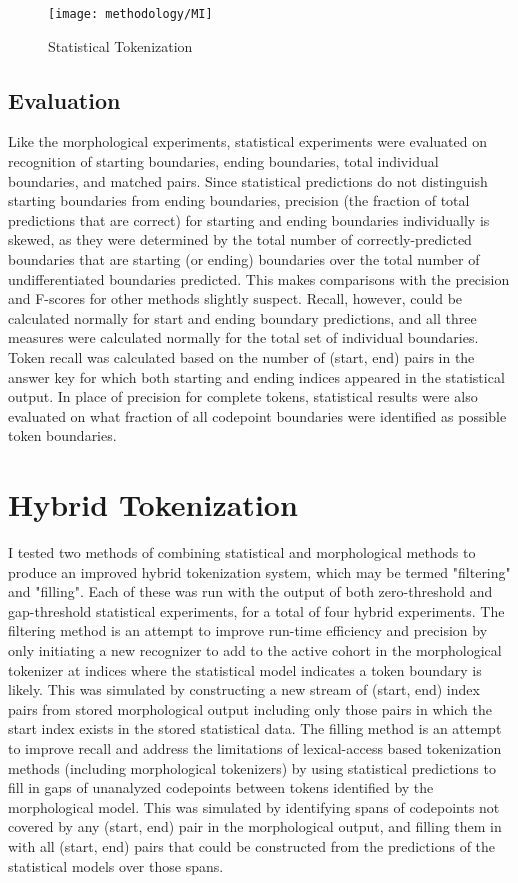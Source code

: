 \begin{figure}[ht!]
	\texttt{[image: methodology/MI]}
	\caption{Statistical Tokenization}
	\label{statdiagram}
\end{figure}

\subsection{Evaluation}
Like the morphological experiments, statistical experiments were evaluated on recognition of starting boundaries, ending boundaries, total individual boundaries, and matched pairs.
Since statistical predictions do not distinguish starting boundaries from ending boundaries, precision (the fraction of total predictions that are correct)  for starting and ending boundaries individually is skewed, as they were determined by the total number of correctly-predicted boundaries that are starting (or ending) boundaries over the total number of undifferentiated boundaries predicted. This makes comparisons with the precision and F-scores for other methods slightly suspect. Recall, however, could be calculated normally for start and ending boundary predictions, and all three measures were calculated normally for the total set of individual boundaries.
Token recall was calculated based on the number of (start, end) pairs in the answer key for which both starting and ending indices appeared in the statistical output. In place of precision for complete tokens, statistical results were also evaluated on what fraction of all codepoint boundaries were identified as possible token boundaries.

\section{Hybrid Tokenization}
I tested two methods of combining statistical and morphological methods to produce an improved hybrid tokenization system, which may be termed "filtering" and "filling". Each of these was run with the output of both zero-threshold and gap-threshold statistical experiments, for a total of four hybrid experiments.
The filtering method is an attempt to improve run-time efficiency and precision by only initiating a new recognizer to add to the active cohort in the morphological tokenizer at indices where the statistical model indicates a token boundary is likely. This was simulated by constructing a new stream of (start, end) index pairs from stored morphological output including only those pairs in which the start index exists in the stored statistical data.
The filling method is an attempt to improve recall and address the limitations of lexical-access based tokenization methods (including morphological tokenizers) by using statistical predictions to fill in gaps of unanalyzed codepoints between tokens identified by the morphological model. This was simulated by identifying spans of codepoints not covered by any (start, end) pair in the morphological output, and filling them in with all (start, end) pairs that could be constructed from the predictions of the statistical models over those spans.

